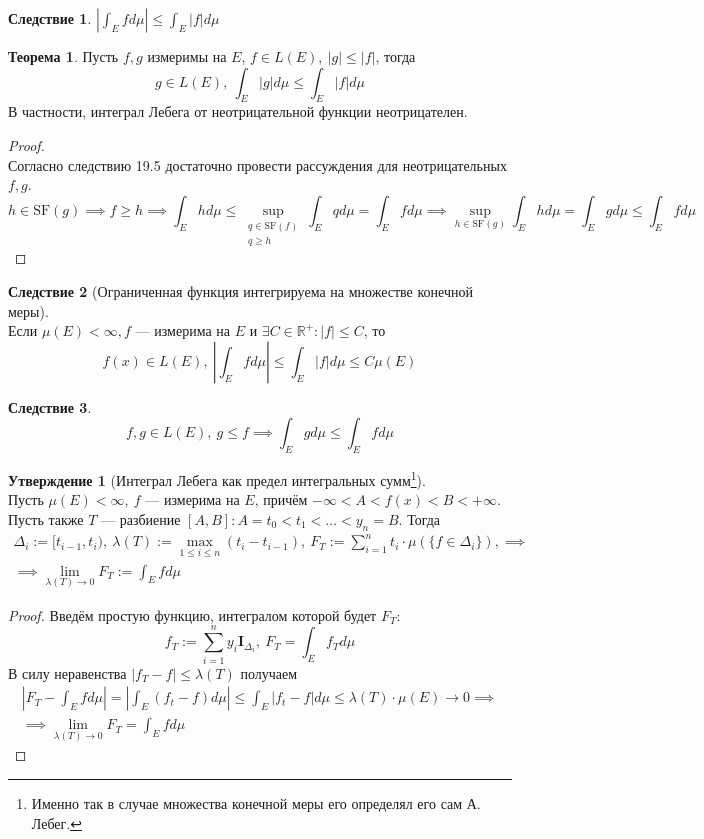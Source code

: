 \documentclass[11pt,a4paper]{report}
\def\Real{\mathbb{R}}
\theoremstyle{definition}
\theoremstyle{definition}
\newtheorem{theorem}{Теорема}[section]
\newtheorem{preposition}{Утверждение}[section]
\newtheorem{corollary}{Следствие}[section]
\theoremstyle{definition}
\begin{document}
		\begin{corollary}
			$ \left | \int_{E} f d\mu \right | \le \int_{E} |f| d\mu $
		\end{corollary}
		\begin{theorem}
			Пусть $ f, g $ измеримы на $ E $, $ f \in L(E),\ |g| \le |f| $, тогда 
			\[ g \in L(E),\ \int_{E} |g| d\mu \le \int_{E} |f| d\mu \]
			В частности, интеграл Лебега от неотрицательной функции неотрицателен.
		\end{theorem}
		\begin{proof}$  $\\
			Согласно следствию 19.5 достаточно провести рассуждения для неотрицательных $ f, g $.\\
			\[ h \in \mbox{SF}(g) \implies f \ge h \implies \int_{E} h d\mu \le \sup\limits_{\substack{q \in \mbox{SF}(f)\\ q \ge h}}\int_{E} q d\mu = \int_{E} f d\mu \implies \sup\limits_{h \in \mbox{SF}(g)}\int_{E} h d\mu = \int_{E} g d\mu \le \int_{E} f d\mu \]
		\end{proof}
		\begin{corollary}[Ограниченная функция интегрируема на множестве конечной меры]$  $\\
			Если $ \mu(E) < \infty, f $ — измерима на $ E $ и $ \exists C \in \Real^{+}: |f| \le C $, то  
			\[ f(x) \in L(E),\ \left| \int_{E} f d\mu \right| \le \int_{E} |f| d\mu \le C \mu(E) \]
		\end{corollary}
		\begin{corollary}
			\[ f, g \in L(E),\ g \le f \implies \int_{E} g d\mu \le \int_{E} f d\mu \]
		\end{corollary}
		\begin{preposition}[Интеграл Лебега как предел интегральных сумм\footnote{Именно так в случае множества конечной меры его определял его сам А. Лебег.}]$  $\\
			Пусть $ \mu(E) < \infty,\ f $ — измерима на $ E $, причём $ -\infty < A < f(x) < B < +\infty $. Пусть также $ T $ — разбиение $ [A, B]: A = t_{0} < t_{1} < \dots < y_{n} = B $. Тогда
			\begin{gather*} 
				\Delta_{i} := [t_{i-1}, t_{i}),\ \lambda(T) := \max\limits_{1 \le i \le n} {(t_{i} - t_{i-1})},\ F_{T} := \sum\limits_{i=1}^{n} t_{i} \cdot \mu( \{f \in \Delta_{i} \} ), \implies\\\implies \lim\limits_{\lambda(T) \to 0} F_{T} := \int_{E} f d\mu 
			\end{gather*}
		\end{preposition}
		\begin{proof}
			Введём простую функцию, интегралом которой будет $ F_{T} $: 
			\[ 
				f_{T}  := \sum\limits_{i=1}^{n} y_{i} \mathbf{I}_{\Delta_{i}},\ F_{T} = \int_{E} f_{T} d\mu 
			\] 
			В силу неравенства $ |f_{T} - f| \le \lambda(T) $ получаем 
			\begin{gather*}
				\left | F_{T} - \int_{E} f d\mu \right | = \left | \int_{E} (f_{t} - f) d\mu \right | \le \int_{E} |f_{t} - f| d\mu \le \lambda(T) \cdot \mu(E) \to 0 \implies\\\implies \lim\limits_{\lambda(T) \to 0} F_{T} = \int_{E} f d\mu
			\end{gather*}
		\end{proof}
\end{document}

